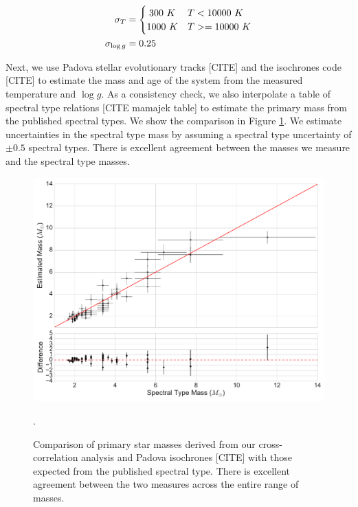\documentclass{emulateapj}
\begin{document}
\begin{align}
 \sigma_T &= \begin{cases}
      \hfill 300\ K \hfill & T < 10000\ K \\
      \hfill 1000\ K \hfill & T >= 10000\ K \\
     \end{cases} \\
 \sigma_{\log{g}} &= 0.25
\end{align}

Next, we use Padova stellar evolutionary tracks [CITE] and the isochrones code [CITE] to estimate the mass and age of the system from the measured temperature and $\log{g}$. As a consistency check, we also interpolate a table of spectral type relations [CITE mamajek table] to estimate the primary mass from the published spectral types. We show the comparison in Figure \ref{fig:prim_mass}. We estimate uncertainties in the spectral type mass by assuming a spectral type uncertainty of $\pm 0.5$ spectral types. There is excellent agreement between the masses we measure and the spectral type masses.

\begin{figure}
\includegraphics[width=\columnwidth]{PrimaryMassEstimates.pdf}
\caption{Comparison of primary star masses derived from our cross-correlation analysis and Padova isochrones [CITE] with those expected from the published spectral type. There is excellent agreement between the two measures across the entire range of masses.}
\label{fig:prim_mass}.
\end{figure}
\end{document}
